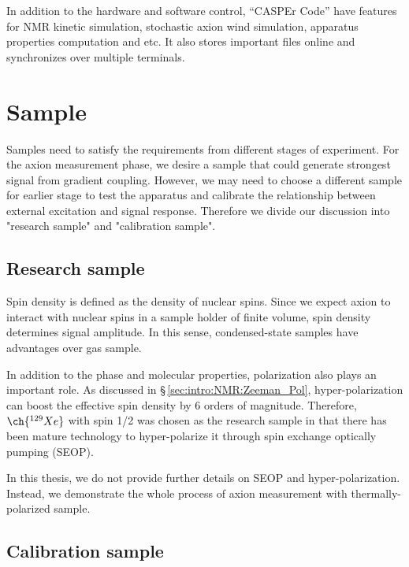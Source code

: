 In addition to the hardware and software control, ``CASPEr Code'' have features for NMR kinetic simulation, stochastic axion wind simulation, apparatus properties computation and etc. It also stores important files online and synchronizes over multiple terminals. 

\section{Sample}

Samples need to satisfy the requirements from different stages of experiment. For the axion measurement phase, we desire a sample that could generate strongest signal from gradient coupling. However, we may need to choose a different sample for earlier stage to test the apparatus and calibrate the relationship between external excitation and signal response. Therefore we divide our discussion into "research sample" and "calibration sample". 

\subsection{Research sample}

Spin density is defined as the density of nuclear spins. Since we expect axion to interact with nuclear spins in a sample holder of finite volume, spin density determines signal amplitude. In this sense, condensed-state samples have advantages over gas sample. 

In addition to the phase and molecular properties, polarization also plays an important role. 
As discussed in \S\,\ref{sec:intro:NMR:Zeeman_Pol}, hyper-polarization can boost the effective spin density by 6 orders of magnitude. Therefore, $\ch{^{129}Xe}$ with spin 1/2 was chosen as the research sample in that there has been mature technology to hyper-polarize it through spin exchange optically pumping (SEOP). 

In this thesis, we do not provide further details on SEOP and hyper-polarization. Instead, we demonstrate the whole process of axion measurement with thermally-polarized sample. 

\subsection{Calibration sample}

